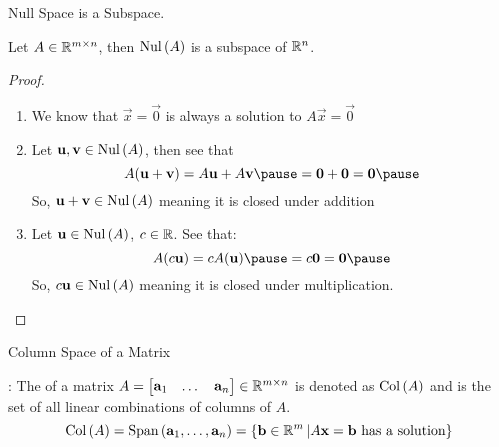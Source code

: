 \documentclass[xcoler=dvipsnames, aspectratio=169]{beamer}
\begin{document}
    \begin{frame}{Null Space is a Subspace.}
        \footnotesize
        \begin{theorem}
            Let $A\in\mathbb{R}^{m\times n}$, then $\mathrm{Nul}\left(A\right)$ is a subspace of $\mathbb{R}^n$.
        \end{theorem}\pause
        \begin{proof}
            \begin{enumerate}
                \item We know that $\vec{x}=\vec{0}$ is always a solution to $A\vec{x}=\vec{0}$
                \pause\item Let $\mathbf{u},\mathbf{v}\in\mathrm{Nul}\left(A\right)$, then see that
                    \[
                        A(\vec{u} + \vec{v}) = A\vec{u} + A\vec{v}\pause = \vec{0} + \vec{0} = \vec{0}\pause
                    \]
                    So, $\mathbf{u}+\mathbf{v}\in\mathrm{Nul}\left(A\right)$ meaning it is closed under addition
                \pause\item Let $\mathbf{u}\in\mathrm{Nul}\left(A\right)$, $c\in\mathbb{R}$. See that:\pause
                    \[
                        A(c\vec{u}) = cA(\vec{u})\pause = c\vec{0} = \vec{0}\pause
                    \]
                    So, $c\mathbf{u}\in\mathrm{Nul}\left(A\right)$ meaning it is closed under multiplication.
            \end{enumerate}
        \end{proof}
    \end{frame}
    \begin{frame}{Column Space of a Matrix}
        \begin{defn}
            : The  of a matrix 
            $A=\begin{bmatrix}\mathbf{a}_1 & \dots & \mathbf{a}_n\end{bmatrix}\in\mathbb{R}^{m\times n}$ is
            denoted as $\mathrm{Col}\left(A\right)$ and is the set of all linear combinations of columns of $A$.
            \[
                \mathrm{Col}\left(A\right) = \text{Span}\left(\mathbf{a}_1,\dots,\mathbf{a}_n\right) = \left\{\mathbf{b}\in\mathbb{R}^m\left|A\mathbf{x} = \mathbf{b}
                \textnormal{ has a solution}\right\}\right.
            \]
        \end{defn}
    \end{frame}
\end{document}
